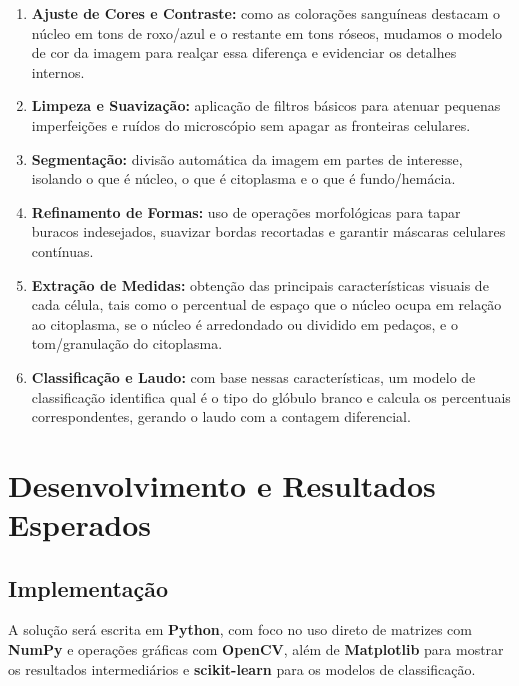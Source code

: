 \documentclass[12pt, a4paper]{article}
\begin{document}
\begin{enumerate}
    \item \textbf{Ajuste de Cores e Contraste:} como as colora\c{c}\~{o}es sangu\'{i}neas destacam o n\'{u}cleo em tons de roxo/azul e o restante em tons r\'{o}seos, mudamos o modelo de cor da imagem para real\c{c}ar essa diferen\c{c}a e evidenciar os detalhes internos.
    
    \item \textbf{Limpeza e Suaviza\c{c}\~{a}o:} aplica\c{c}\~{a}o de filtros b\'{a}sicos para atenuar pequenas imperfei\c{c}\~{o}es e ru\'{i}dos do microsc\'{o}pio sem apagar as fronteiras celulares.
    
    \item \textbf{Segmenta\c{c}\~{a}o:} divis\~{a}o autom\'{a}tica da imagem em partes de interesse, isolando o que \'{e} n\'{u}cleo, o que \'{e} citoplasma e o que \'{e} fundo/hem\'{a}cia.
    
    \item \textbf{Refinamento de Formas:} uso de opera\c{c}\~{o}es morfol\'{o}gicas para tapar buracos indesejados, suavizar bordas recortadas e garantir m\'{a}scaras celulares cont\'{i}nuas.
    
    \item \textbf{Extra\c{c}\~{a}o de Medidas:} obten\c{c}\~{a}o das principais caracter\'{i}sticas visuais de cada c\'{e}lula, tais como o percentual de espa\c{c}o que o n\'{u}cleo ocupa em rela\c{c}\~{a}o ao citoplasma, se o n\'{u}cleo \'{e} arredondado ou dividido em peda\c{c}os, e o tom/granula\c{c}\~{a}o do citoplasma.
    
    \item \textbf{Classifica\c{c}\~{a}o e Laudo:} com base nessas caracter\'{i}sticas, um modelo de classifica\c{c}\~{a}o identifica qual \'{e} o tipo do gl\'{o}bulo branco e calcula os percentuais correspondentes, gerando o laudo com a contagem diferencial.
\end{enumerate}

\section{Desenvolvimento e Resultados Esperados}

\subsection{Implementa\c{c}\~{a}o}
A solu\c{c}\~{a}o ser\'{a} escrita em \textbf{Python}, com foco no uso direto de matrizes com \textbf{NumPy} e opera\c{c}\~{o}es gr\'{a}ficas com \textbf{OpenCV}, al\'{e}m de \textbf{Matplotlib} para mostrar os resultados intermedi\'{a}rios e \textbf{scikit-learn} para os modelos de classifica\c{c}\~{a}o.
\end{document}
